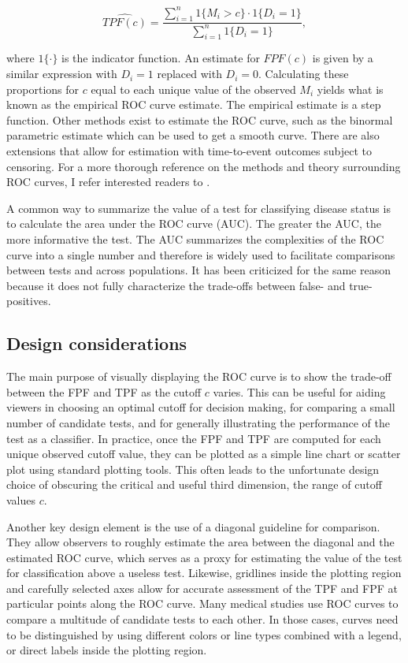 \documentclass[codesnippet]{jss}
\begin{document}
\[ \widehat{TPF(c)} = \frac{\sum_{i = 1}^n 1\{M_i > c\} \cdot 1\{D_i = 1\}}{\sum_{i=1}^n 1\{D_i = 1\}}, \]

where \(1\{\cdot\}\) is the indicator function. An estimate for
\(FPF(c)\) is given by a similar expression with \(D_i = 1\) replaced
with \(D_i = 0\). Calculating these proportions for \(c\) equal to each
unique value of the observed \(M_i\) yields what is known as the
empirical ROC curve estimate. The empirical estimate is a step function.
Other methods exist to estimate the ROC curve, such as the binormal
parametric estimate which can be used to get a smooth curve. There are
also extensions that allow for estimation with time-to-event outcomes
subject to censoring. For a more thorough reference on the methods and
theory surrounding ROC curves, I refer interested readers to
\citet{pepe2003statistical}.

A common way to summarize the value of a test for classifying disease
status is to calculate the area under the ROC curve (AUC). The greater
the AUC, the more informative the test. The AUC summarizes the
complexities of the ROC curve into a single number and therefore is
widely used to facilitate comparisons between tests and across
populations. It has been criticized for the same reason because it does
not fully characterize the trade-offs between false- and true-positives.

\subsection{Design considerations}\label{design-considerations}

The main purpose of visually displaying the ROC curve is to show the
trade-off between the FPF and TPF as the cutoff \(c\) varies. This can
be useful for aiding viewers in choosing an optimal cutoff for decision
making, for comparing a small number of candidate tests, and for
generally illustrating the performance of the test as a classifier. In
practice, once the FPF and TPF are computed for each unique observed
cutoff value, they can be plotted as a simple line chart or scatter plot
using standard plotting tools. This often leads to the unfortunate
design choice of obscuring the critical and useful third dimension, the
range of cutoff values \(c\).

Another key design element is the use of a diagonal guideline for
comparison. They allow observers to roughly estimate the area between
the diagonal and the estimated ROC curve, which serves as a proxy for
estimating the value of the test for classification above a useless
test. Likewise, gridlines inside the plotting region and carefully
selected axes allow for accurate assessment of the TPF and FPF at
particular points along the ROC curve. Many medical studies use ROC
curves to compare a multitude of candidate tests to each other. In those
cases, curves need to be distinguished by using different colors or line
types combined with a legend, or direct labels inside the plotting
region.
\end{document}
